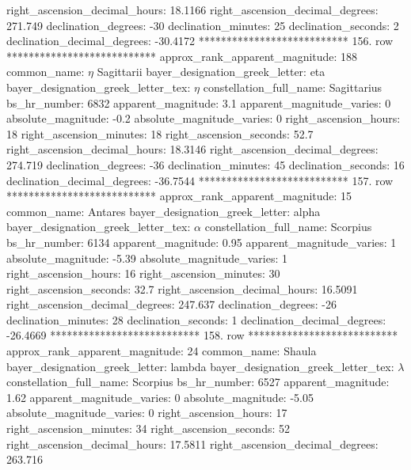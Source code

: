      right_ascension_decimal_hours: 18.1166
   right_ascension_decimal_degrees: 271.749
               declination_degrees: -30
               declination_minutes: 25
               declination_seconds: 2
       declination_decimal_degrees: -30.4172
*************************** 156. row ***************************
    approx_rank_apparent_magnitude: 188
                       common_name: $\eta$ Sagittarii
    bayer_designation_greek_letter: eta
bayer_designation_greek_letter_tex: $\eta$
           constellation_full_name: Sagittarius
                      bs_hr_number: 6832
                apparent_magnitude: 3.1
         apparent_magnitude_varies: 0
                absolute_magnitude: -0.2
         absolute_magnitude_varies: 0
             right_ascension_hours: 18
           right_ascension_minutes: 18
           right_ascension_seconds: 52.7
     right_ascension_decimal_hours: 18.3146
   right_ascension_decimal_degrees: 274.719
               declination_degrees: -36
               declination_minutes: 45
               declination_seconds: 16
       declination_decimal_degrees: -36.7544
*************************** 157. row ***************************
    approx_rank_apparent_magnitude: 15
                       common_name: Antares
    bayer_designation_greek_letter: alpha
bayer_designation_greek_letter_tex: $\alpha$
           constellation_full_name: Scorpius
                      bs_hr_number: 6134
                apparent_magnitude: 0.95
         apparent_magnitude_varies: 1
                absolute_magnitude: -5.39
         absolute_magnitude_varies: 1
             right_ascension_hours: 16
           right_ascension_minutes: 30
           right_ascension_seconds: 32.7
     right_ascension_decimal_hours: 16.5091
   right_ascension_decimal_degrees: 247.637
               declination_degrees: -26
               declination_minutes: 28
               declination_seconds: 1
       declination_decimal_degrees: -26.4669
*************************** 158. row ***************************
    approx_rank_apparent_magnitude: 24
                       common_name: Shaula
    bayer_designation_greek_letter: lambda
bayer_designation_greek_letter_tex: $\lambda$
           constellation_full_name: Scorpius
                      bs_hr_number: 6527
                apparent_magnitude: 1.62
         apparent_magnitude_varies: 0
                absolute_magnitude: -5.05
         absolute_magnitude_varies: 0
             right_ascension_hours: 17
           right_ascension_minutes: 34
           right_ascension_seconds: 52
     right_ascension_decimal_hours: 17.5811
   right_ascension_decimal_degrees: 263.716
